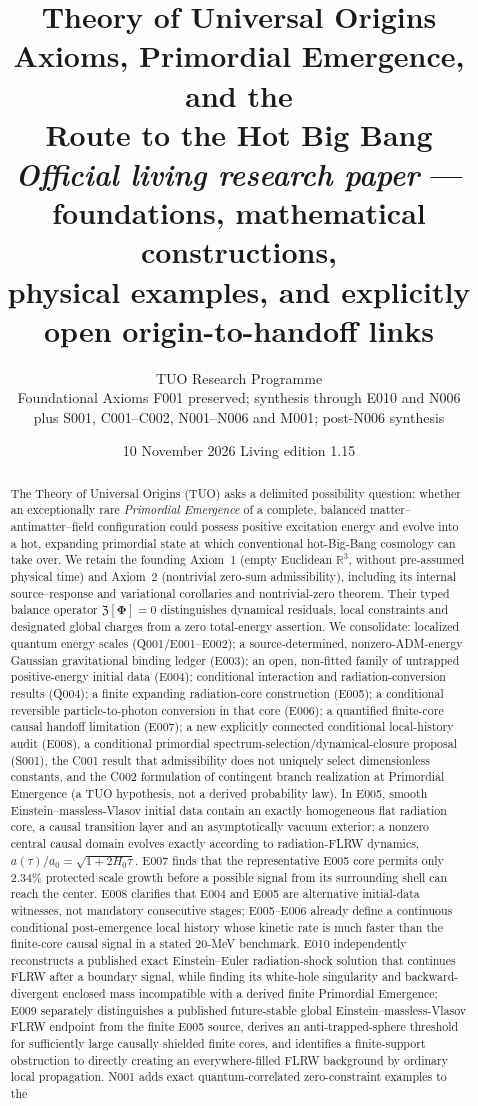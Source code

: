 \documentclass[11pt,a4paper]{article}
\title{\textcolor{deep}{\bfseries Theory of Universal Origins}\\[6pt]
\Large Axioms, Primordial Emergence, and the\\[-1pt]
\Large Route to the Hot Big Bang\\[7pt]
\normalsize \textit{Official living research paper} --- foundations, mathematical constructions,\\
physical examples, and explicitly open origin-to-handoff links}
\author{TUO Research Programme\\[3pt]\small Foundational Axioms F001 preserved; synthesis through E010 and N006\\\small plus S001, C001--C002, N001--N006 and M001; post-N006 synthesis}
\date{10 November 2026 \;\textbullet\; Living edition 1.15}
\newcommand{\R}{\mathbb{R}}
\newcommand{\cZ}{\mathfrak Z}
\theoremstyle{tmon}
\theoremstyle{definition}
\begin{document}
\maketitle
\vspace{-1.5em}
\begin{abstract}
The Theory of Universal Origins (TUO) asks a delimited possibility question: whether an exceptionally rare \emph{Primordial Emergence} of a complete, balanced matter--antimatter--field configuration could possess positive excitation energy and evolve into a hot, expanding primordial state at which conventional hot-Big-Bang cosmology can take over. We retain the founding Axiom~1 (empty Euclidean $\R^3$, without pre-assumed physical time) and Axiom~2 (nontrivial zero-sum admissibility), including its internal source--response and variational corollaries and nontrivial-zero theorem. Their typed balance operator $\cZ[\bm\Phi]=0$ distinguishes dynamical residuals, local constraints and designated global charges from a zero total-energy assertion. We consolidate: localized quantum energy scales (Q001/E001--E002); a source-determined, nonzero-ADM-energy Gaussian gravitational binding ledger (E003); an open, non-fitted family of untrapped positive-energy initial data (E004); conditional interaction and radiation-conversion results (Q004); a finite expanding radiation-core construction (E005); a conditional reversible particle-to-photon conversion in that core (E006); a quantified finite-core causal handoff limitation (E007); a new explicitly connected conditional local-history audit (E008), a conditional primordial spectrum-selection/dynamical-closure proposal (S001), the C001 result that admissibility does not uniquely select dimensionless constants, and the C002 formulation of contingent branch realization at Primordial Emergence (a TUO hypothesis, not a derived probability law). In E005, smooth Einstein--massless-Vlasov initial data contain an exactly homogeneous flat radiation core, a causal transition layer and an asymptotically vacuum exterior; a nonzero central causal domain evolves exactly according to radiation-FLRW dynamics, $a(\tau)/a_0=\sqrt{1+2H_0\tau}$. E007 finds that the representative E005 core permits only $2.34\%$ protected scale growth before a possible signal from its surrounding shell can reach the center. E008 clarifies that E004 and E005 are alternative initial-data witnesses, not mandatory consecutive stages; E005--E006 already define a continuous conditional post-emergence local history whose kinetic rate is much faster than the finite-core causal signal in a stated 20-MeV benchmark. E010 independently reconstructs a published exact Einstein--Euler radiation-shock solution that continues FLRW after a boundary signal, while finding its white-hole singularity and backward-divergent enclosed mass incompatible with a derived finite Primordial Emergence; E009 separately distinguishes a published future-stable global Einstein--massless-Vlasov FLRW endpoint from the finite E005 source, derives an anti-trapped-sphere threshold for sufficiently large causally shielded finite cores, and identifies a finite-support obstruction to directly creating an everywhere-filled FLRW background by ordinary local propagation. N001 adds exact quantum-correlated zero-constraint examples to the 
\end{abstract}
\end{document}
